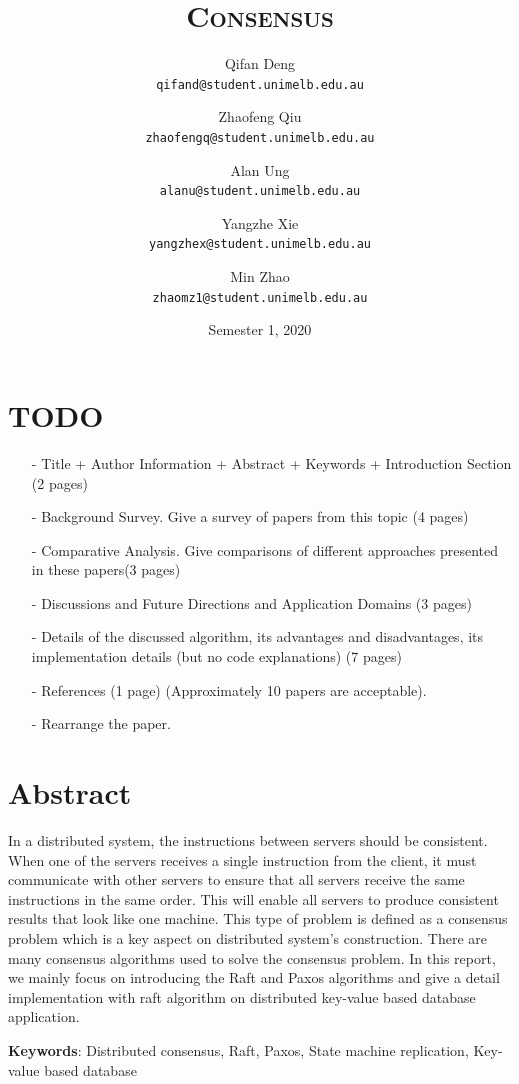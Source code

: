\documentclass[12pt, a4paper]{article}
\title{\textsc{Consensus}}
\author{
  Qifan Deng \\
  \texttt{\small qifand@student.unimelb.edu.au}
  \and
  Zhaofeng Qiu \\
  \texttt{\small zhaofengq@student.unimelb.edu.au}
  \and
  Alan Ung \\
  \texttt{\small alanu@student.unimelb.edu.au}
  \and
  Yangzhe Xie \\
  \texttt{\small yangzhex@student.unimelb.edu.au}
  \and
  Min Zhao \\
  \texttt{\small zhaomz1@student.unimelb.edu.au}
}
\date{Semester 1, 2020}
\begin{document}
\maketitle
\thispagestyle{firststyle}

\section{TODO}
\begin{itemize}

\item[-] Title + Author Information + Abstract + Keywords + Introduction Section (2 pages)

\item[-] Background Survey. Give a survey of papers from this topic (4 pages)
\item[-] Comparative Analysis. Give comparisons of different
approaches presented in these papers(3 pages)
\item[-] Discussions and Future Directions and Application Domains (3 pages)
\item[-] Details of the discussed algorithm, its advantages and disadvantages, its implementation details (but no code explanations) (7 pages)
\item[-] References (1 page) (Approximately 10 papers are acceptable).
\item[-] Rearrange the paper.
\end{itemize}

\section{Abstract}
In a distributed system, the instructions between servers should be consistent. When one of the servers receives a single instruction from the client, it must communicate with other servers to ensure that all servers receive the same instructions in the same order. This will enable all servers to produce consistent results that look like one machine. This type of problem is defined as a consensus problem which is a key aspect on distributed system’s construction. There are many consensus algorithms used to solve the consensus problem. In this report, we mainly focus on introducing the Raft and Paxos algorithms and give a detail implementation with raft algorithm on distributed key-value based database application. 



\textbf{Keywords}: Distributed consensus, Raft, Paxos, State machine replication, Key-value based database
\end{document}
